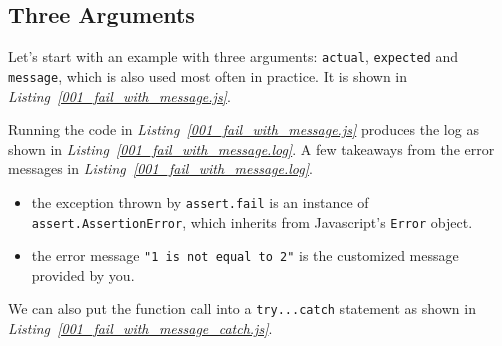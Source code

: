 \subsection{Three Arguments}
Let's start with an example with three arguments: \texttt{actual}, \texttt{expected} and \texttt{message}, which is also used most often in practice. It is shown in \textit{Listing~\ref{001_fail_with_message.js}}.

Running the code in \textit{Listing~\ref{001_fail_with_message.js}} produces the log as shown in \textit{Listing~\ref{001_fail_with_message.log}}.
A few takeaways from the error messages in \textit{Listing~\ref{001_fail_with_message.log}}.
\begin{itemize}
\item the exception thrown by \texttt{assert.fail} is an instance of \texttt{assert.AssertionError}, which inherits from Javascript's \texttt{Error} object.
\item the error message \texttt{"1 is not equal to 2"} is the customized message provided by you.
\end{itemize}
We can also put the function call into a \texttt{try...catch} statement as shown in \textit{Listing~\ref{001_fail_with_message_catch.js}}.

